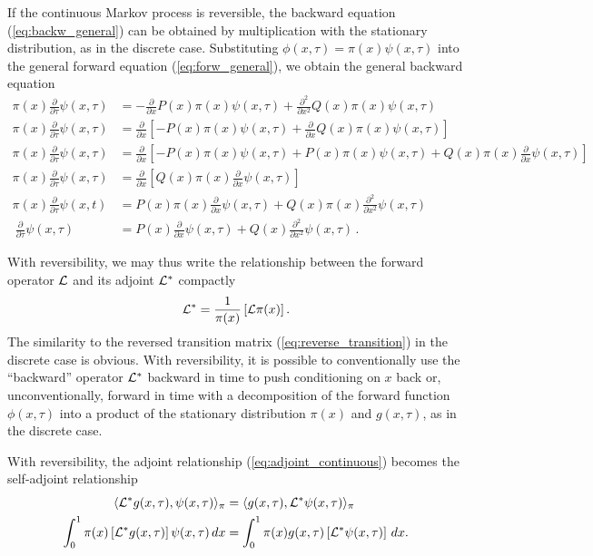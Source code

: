 \documentclass[preprint]{elsarticle}
\begin{document}
If the continuous Markov process is reversible, the backward equation (\ref{eq:backw_general}) can be obtained by multiplication with the stationary distribution, as in the discrete case. Substituting $\phi(x,\tau)=\pi(x)\psi(x,\tau)$ into the general forward equation (\ref{eq:forw_general}), we obtain the general backward equation
\begin{equation}
\begin{split}
\pi(x)\frac{\partial}{\partial \tau} \psi(x,\tau)&=-\frac{\partial}{\partial x}P(x)\pi(x)\psi(x,\tau)+\frac{\partial^2}{\partial x^2}Q(x)\pi(x) \psi(x,\tau)\\
\pi(x)\frac{\partial}{\partial \tau}\psi(x,\tau)&=\frac{\partial}{\partial x}\left[-P(x)\pi(x)\psi(x,\tau)+\frac{\partial}{\partial x}Q(x)\pi(x)\psi(x,\tau)\right]\\
\pi(x)\frac{\partial}{\partial \tau}\psi(x,\tau)&=\frac{\partial}{\partial x}\left[-P(x)\pi(x)\psi(x,\tau)+P(x)\pi(x)\psi(x,\tau)+Q(x)\pi(x)\frac{\partial}{\partial x}\psi(x,\tau)\right]\\
\pi(x)\frac{\partial}{\partial \tau}\psi(x,\tau)&=\frac{\partial}{\partial x}\left[Q(x)\pi(x)\frac{\partial}{\partial x}\psi(x,\tau)\right]\\
\pi(x)\frac{\partial}{\partial \tau}\psi(x,t)&=P(x)\pi(x)\frac{\partial}{\partial x}\psi(x,\tau) +Q(x)\pi(x)\frac{\partial^2}{\partial x^2}\psi(x,\tau)\\\
\frac{\partial}{\partial \tau}\psi(x,\tau)&=P(x)\frac{\partial}{\partial x}\psi(x,\tau)+Q(x)\frac{\partial^2}{\partial x^2}\psi(x,\tau)\,.
\end{split}
\end{equation}

With reversibility, we may thus write the relationship between the forward operator ${\cal L}$ and its adjoint ${\cal L}^{*}$ compactly
\begin{equation}
{\cal L}^{*}=\frac1{\pi(x)}\left[{\cal L}\pi(x)\right].
\end{equation}
The similarity to the reversed transition matrix (\ref{eq:reverse_transition}) in the discrete case is obvious. With reversibility, it is possible to conventionally use the ``backward'' operator ${\cal L}^{*}$ backward in time to push conditioning on $x$ back or, unconventionally, forward in time with a decomposition of the forward function  $\phi(x,\tau)$ into a product of the stationary distribution $\pi(x)$ and $g(x,\tau)$, as in the discrete case.

With reversibility, the adjoint relationship (\ref{eq:adjoint_continuous}) becomes the self-adjoint relationship \citep{Song12}
\begin{equation}\label{eq:selfadjoint}
\begin{split}
\langle {\cal L}^{*} g(x,\tau),\psi(x,\tau) \rangle_{\pi}&=\langle g(x,\tau),{\cal L}^{*} \psi(x,\tau) \rangle_{\pi}\\
\int_0^1 \pi(x) \left[{\cal L}^{*} g(x,\tau)\right]\psi(x,\tau)\,dx&=
\int_0^1  \pi(x)g(x,\tau)\left[{\cal L}^{*} \psi(x,\tau)\right]\,dx.
\end{split}
\end{equation}
\end{document}
